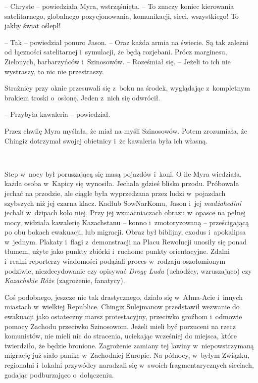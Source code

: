 \documentclass[oneside,polish,11pt,sfheadings]{mwbk}
\begin{document}
-- Chryste -- powiedziała Myra, wstrząśnięta. -- To znaczy koniec
kierowania satelitarnego, globalnego pozycjonowania, komunikacji, sieci,
wszystkiego! To jakby świat oślepł!

-- Tak -- powiedział ponuro Jason. -- Oraz każda armia na świecie. Są tak
zależni od łączności satelitarnej i~symulacji, że będą rozjebani. Prócz
marginesu, Zielonych, barbarzyńców i~Szinosowów. -- Roześmiał się. -- Jeżeli to ich nie wystraszy, to nic nie przestraszy.

Strażnicy przy oknie przesuwali się z~boku na środek, wyglądając z~kompletnym brakiem troski o~osłonę. Jeden z~nich się odwrócił.

-- Przybyła kawaleria -- powiedział.

Przez chwilę Myra myślała, że miał na myśli Szinosowów. Potem
zrozumiała, że Chingiz dotrzymał swojej obietnicy i~że kawaleria była
ich własną.

~

Step w~nocy był poruszającą się masą pojazdów i~koni. O ile Myra
wiedziała, każda osoba w~Kapicy się wynosiła. Jechała gdzieś blisko
przodu. Próbowała jechać na przodzie, ale ciągle była wyprzedzana przez
ludzi w~pojazdach szybszych niż jej czarna klacz. Kadłub SowNarKomu,
Jason i~jej \textit{mudżahedini} jechali w~dżipach koło niej. Przy jej
wzmacniaczach obrazu w~opasce na pełnej mocy, widziała kawalerię
Kazachstanu -- konno i~zmotoryzowaną -- prześcigającą po obu bokach
ewakuacji, lub migracji. Obraz był biblijny, exodus i~apokalipsa w~jednym. Plakaty i~flagi z~demonstracji na Placu Rewolucji unosiły się
ponad tłumem, użyte jako punkty zbiórki i~ruchome punkty orientacyjne.
Zdalni i~realni reporterzy wiadomości podążali proces w~rodzaju
oszołomionym podziwie, niezdecydowanie czy opisywać \textit{Drogę Ludu}
(uchodźcy, wzruszająco) czy \textit{Kazachskie Róże} (zagrożenie,
fanatycy).

Coś podobnego, jeszcze nie tak drastycznego, działo się w~Ałma-Acie i~innych miastach w~wielkiej Republice. Chingiz Sulejmanow przedstawił
wezwanie do ewakuacji jako ostateczny marsz protestacyjny, przeciwko
groźbom i~odmowie pomocy Zachodu przeciwko Szinosowom. Jeżeli mieli być
porzuceni na rzecz komunistów, nie mieli nic do stracenia, uciekając
wcześniej do miejsca, które twierdziło, że będzie bronione. Zagrożenie
zamiany tej lawiny w~niepowstrzymaną migrację już siało panikę w~Zachodniej Europie. Na północy, w~byłym Związku, regionalni i~lokalni
przywódcy naradzali się w~swoich fragmentarycznych sieciach, gadając
podburzająco o~dołączeniu.
\end{document}

